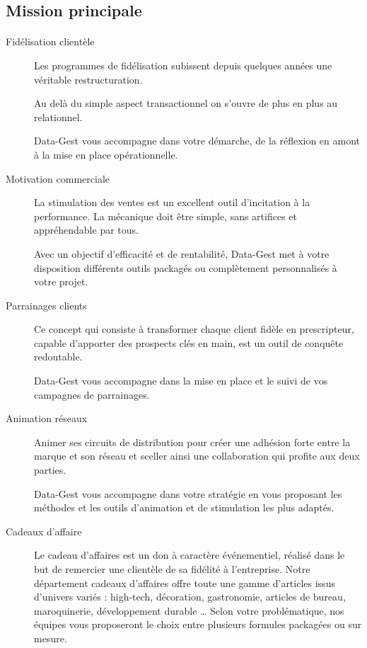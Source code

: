 \subsection{Mission principale}
\paragraph{}
\begin{description}
  \item[Fidélisation clientèle]Les programmes de fidélisation subissent depuis quelques années une véritable restructuration.

Au delà du simple aspect transactionnel on s’ouvre de plus en plus au relationnel.

Data-Gest vous accompagne dans votre démarche, de la réflexion en amont à la mise en place opérationnelle.

  \item[Motivation commerciale]La stimulation des ventes est un excellent outil d'incitation à la performance. La mécanique doit être simple, sans artifices et appréhendable par tous.

Avec un objectif d'efficacité et de rentabilité, Data-Gest met à votre disposition différents outils packagés ou complètement personnalisés à votre projet.
  \item[Parrainages clients]Ce concept qui consiste à transformer chaque client fidèle en prescripteur, capable d'apporter des prospects clés en main, est un outil de conquête redoutable.

Data-Gest vous accompagne dans la mise en place et le suivi de vos campagnes de parrainages.
  \item[Animation réseaux]Animer ses circuits de distribution pour créer une adhésion forte entre la marque et son réseau et sceller ainsi une collaboration qui profite aux deux parties.

Data-Gest vous accompagne dans votre stratégie en vous proposant les méthodes et les outils d'animation et de stimulation les plus adaptés.
  \item[Cadeaux d'affaire]
Le cadeau d'affaires est un don à caractère événementiel, réalisé dans le but de remercier une clientèle de sa fidélité à l'entreprise. Notre département cadeaux d'affaires offre toute une gamme d'articles issus d'univers variés : high-tech, décoration, gastronomie, articles de bureau, maroquinerie, développement durable …
Selon votre problématique, nos équipes vous proposeront le choix entre plusieurs formules packagées ou sur mesure. 

\end{description}
